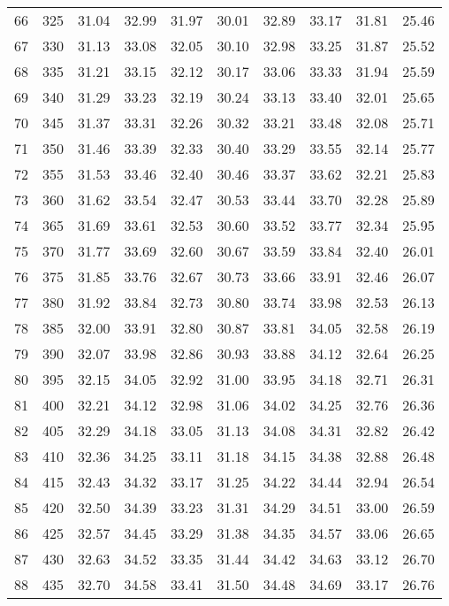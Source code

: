 \begin{longtable}{rrllllllll}
66 & 325 & 31.04 & 32.99 & 31.97 & 30.01 & 32.89 & 33.17 & 31.81 & 25.46 \\ 
67 & 330 & 31.13 & 33.08 & 32.05 & 30.10 & 32.98 & 33.25 & 31.87 & 25.52 \\ 
68 & 335 & 31.21 & 33.15 & 32.12 & 30.17 & 33.06 & 33.33 & 31.94 & 25.59 \\ 
69 & 340 & 31.29 & 33.23 & 32.19 & 30.24 & 33.13 & 33.40 & 32.01 & 25.65 \\ 
70 & 345 & 31.37 & 33.31 & 32.26 & 30.32 & 33.21 & 33.48 & 32.08 & 25.71 \\ 
71 & 350 & 31.46 & 33.39 & 32.33 & 30.40 & 33.29 & 33.55 & 32.14 & 25.77 \\ 
72 & 355 & 31.53 & 33.46 & 32.40 & 30.46 & 33.37 & 33.62 & 32.21 & 25.83 \\ 
73 & 360 & 31.62 & 33.54 & 32.47 & 30.53 & 33.44 & 33.70 & 32.28 & 25.89 \\ 
74 & 365 & 31.69 & 33.61 & 32.53 & 30.60 & 33.52 & 33.77 & 32.34 & 25.95 \\ 
75 & 370 & 31.77 & 33.69 & 32.60 & 30.67 & 33.59 & 33.84 & 32.40 & 26.01 \\ 
76 & 375 & 31.85 & 33.76 & 32.67 & 30.73 & 33.66 & 33.91 & 32.46 & 26.07 \\ 
77 & 380 & 31.92 & 33.84 & 32.73 & 30.80 & 33.74 & 33.98 & 32.53 & 26.13 \\ 
78 & 385 & 32.00 & 33.91 & 32.80 & 30.87 & 33.81 & 34.05 & 32.58 & 26.19 \\ 
79 & 390 & 32.07 & 33.98 & 32.86 & 30.93 & 33.88 & 34.12 & 32.64 & 26.25 \\ 
80 & 395 & 32.15 & 34.05 & 32.92 & 31.00 & 33.95 & 34.18 & 32.71 & 26.31 \\ 
81 & 400 & 32.21 & 34.12 & 32.98 & 31.06 & 34.02 & 34.25 & 32.76 & 26.36 \\ 
82 & 405 & 32.29 & 34.18 & 33.05 & 31.13 & 34.08 & 34.31 & 32.82 & 26.42 \\ 
83 & 410 & 32.36 & 34.25 & 33.11 & 31.18 & 34.15 & 34.38 & 32.88 & 26.48 \\ 
84 & 415 & 32.43 & 34.32 & 33.17 & 31.25 & 34.22 & 34.44 & 32.94 & 26.54 \\ 
85 & 420 & 32.50 & 34.39 & 33.23 & 31.31 & 34.29 & 34.51 & 33.00 & 26.59 \\ 
86 & 425 & 32.57 & 34.45 & 33.29 & 31.38 & 34.35 & 34.57 & 33.06 & 26.65 \\ 
87 & 430 & 32.63 & 34.52 & 33.35 & 31.44 & 34.42 & 34.63 & 33.12 & 26.70 \\ 
88 & 435 & 32.70 & 34.58 & 33.41 & 31.50 & 34.48 & 34.69 & 33.17 & 26.76 \\ 

\end{longtable}
